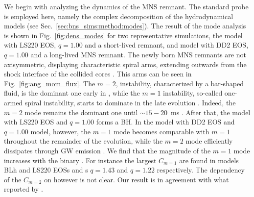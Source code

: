 We begin with analyzing the \pmerg{} dynamics of the \ac{MNS} remnant. The standard 
probe is employed here, namely the complex decomposition of the hydrodynamical models
(see Sec.~\ref{sec:bns_sims:method:modes}). 
%
The result of the mode analysis is shown in Fig.~\ref{fig:dens_modes} for two 
representative simulations, the model with LS220 \ac{EOS}, $q=1.00$ and a 
short-lived remnant, and model with DD2 \ac{EOS}, $q=1.00$ and a long-lived 
\ac{MNS} remnant.
%
The newly born \ac{MNS} remnants are not axisymmetric, displaying characteristic 
spiral arms, extending outwards from the shock interface of the collided cores 
\citep{Shibata:1999wm,Shibata:2006nm,Bernuzzi:2013rza,Kastaun:2014fna,East:2015vix,Paschalidis:2015mla,Radice:2016gym,Lehner:2016wjg}.
%
This arms can be seen in Fig.~\ref{fig:ang_mom_flux}. 
%
The $m=2$, instability, characterized by a bar-shaped fluid, is the dominant one early 
in \pmerg{}, while the $m=1$ instability, so-called one-armed spiral instability, 
starts to dominate in the late evolution 
\citep{East:2015vix,Paschalidis:2015mla,Radice:2016gym,Lehner:2016wjg,Bernuzzi:2013rza,Kastaun:2014fna}.
%
Indeed, the $m=2$ mode remains the dominant one until $\sim15-20$~ms \pmerg{}. 
After that, the model with LS220 \ac{EOS} and $q=1.00$ forms a \ac{BH}. 
In the model with DD2 \ac{EOS} and $q=1.00$ model, however, the $m=1$ mode 
becomes comparable with $m=1$ throughout the remainder of the evolution, while 
the $m=2$ mode efficiently dissipates through \ac{GW} emission 
\citep{Bernuzzi:2015opx,Radice:2016gym}.
%
We find that the magnitude of the $m=1$ mode increases with the binary \mr{}.
For instance the largest $C_{m=1}$ are found in models BLh and LS220 \acp{EOS}
and \mr{}s $q=1.43$ and $q=1.22$ respectively. 
The dependency of the $C_{m=2}$ on \mr{} however is not clear. 
Our result is in agreement with what reported by \citet{Lehner:2016wjg}.

